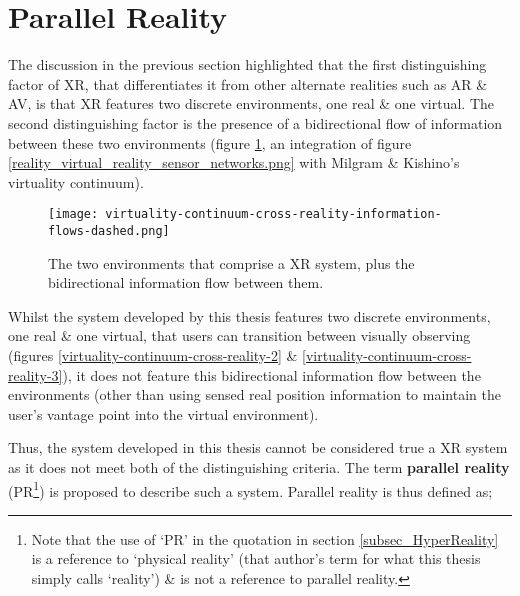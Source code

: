 
\section{Parallel Reality}

\newcommand{\PRfootnote}{\footnote{Note that the use of `PR' in the quotation in section \ref{subsec_HyperReality} is a reference to `physical reality' (that author's term for what this thesis simply calls `reality') \& is not a reference to parallel reality.}}

The discussion in the previous section highlighted that the first distinguishing factor of XR, that differentiates it from other alternate realities such as AR \& AV, is that XR features two discrete environments, one real \& one virtual. The second distinguishing factor is the presence of a bidirectional flow of information between these two environments (figure \ref{virtuality-continuum-cross-reality-information-flows-dashed.png}, an integration of figure \ref{reality_virtual_reality_sensor_networks.png} with Milgram \& Kishino's virtuality continuum).

\begin{figure}[h]
	\begin{center}
		\texttt{[image: virtuality-continuum-cross-reality-information-flows-dashed.png]}
		\caption{The two environments that comprise a XR system, plus the bidirectional information flow between them.}
		\label{virtuality-continuum-cross-reality-information-flows-dashed.png}
	\end{center}
\end{figure}

Whilst the system developed by this thesis features two discrete environments, one real \& one virtual, that users can transition between visually observing (figures \ref{virtuality-continuum-cross-reality-2} \& \ref{virtuality-continuum-cross-reality-3}), it does not feature this bidirectional information flow between the environments (other than using sensed real position information to maintain the user's vantage point into the virtual environment).

Thus, the system developed in this thesis cannot be considered true a XR system as it does not meet both of the distinguishing criteria. The term \textbf{parallel reality} (PR\PRfootnote{}) is proposed to describe such a system. Parallel reality is thus defined as;

